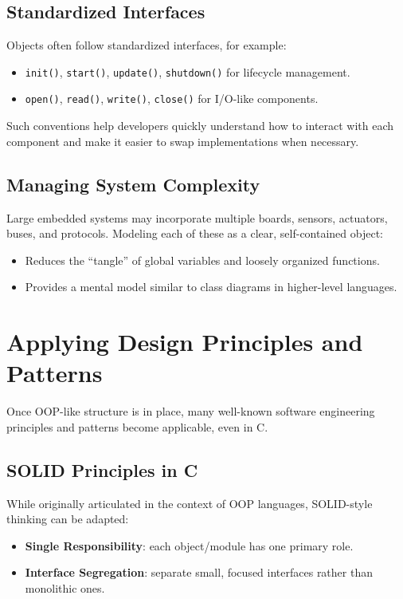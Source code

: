 \documentclass[11pt]{article}
\begin{document}
\subsection{Standardized Interfaces}

Objects often follow standardized interfaces, for example:
\begin{itemize}[nosep]
  \item \texttt{init()}, \texttt{start()}, \texttt{update()}, \texttt{shutdown()} for lifecycle management.
  \item \texttt{open()}, \texttt{read()}, \texttt{write()}, \texttt{close()} for I/O-like components.
\end{itemize}

Such conventions help developers quickly understand how to interact with each component and make it easier to swap implementations when necessary.

\subsection{Managing System Complexity}

Large embedded systems may incorporate multiple boards, sensors, actuators, buses, and protocols. Modeling each of these as a clear, self-contained object:
\begin{itemize}[nosep]
  \item Reduces the ``tangle'' of global variables and loosely organized functions.
  \item Provides a mental model similar to class diagrams in higher-level languages.
\end{itemize}

\section{Applying Design Principles and Patterns}

Once OOP-like structure is in place, many well-known software engineering principles and patterns become applicable, even in C.

\subsection{SOLID Principles in C}

While originally articulated in the context of OOP languages, SOLID-style thinking can be adapted:
\begin{itemize}[nosep]
  \item \textbf{Single Responsibility}: each object/module has one primary role.
  \item \textbf{Interface Segregation}: separate small, focused interfaces rather than monolithic ones.
\end{itemize}
\end{document}
